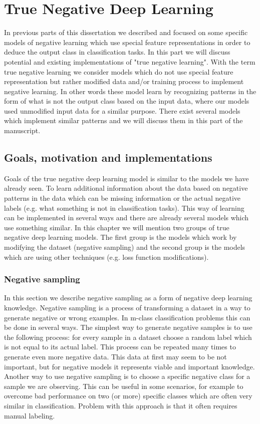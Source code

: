 \documentclass[b5paper]{book}
\begin{document}
\part{True Negative Deep Learning}

In previous parts of this dissertation we described and focused on some specific models of negative learning which use special feature representations in order to deduce the output class in classification tasks. In this part we will discuss potential and existing implementations of "true negative learning". With the term true negative learning we consider models which do not use special feature representation but rather modified data and/or training process to implement negative learning. In other words these model learn by recognizing patterns in the form of what is not the output class based on the input data, where our models used unmodified input data for a similar purpose. There exist several models which implement similar patterns and we will discuss them in this part of the manuscript.

\chapter{Goals, motivation and implementations}

Goals of the true negative deep learning model is similar to the models we have already seen. To learn additional information about the data based on negative patterns in the data which can be missing information or the actual negative labels (e.g. what something is not in classification tasks). This way of learning can be implemented in several ways and there are already several models which use something similar. In this chapter we will mention two groups of true negative deep learning models. The first group is the models which work by modifying the dataset (negative sampling) and the second group is the models which are using other techniques (e.g. loss function modifications).

\section{Negative sampling}

In this section we describe negative sampling as a form of negative deep learning knowledge. Negative sampling is a process of transforming a dataset in a way to generate negative or wrong examples. In m-class classification problems this can be done in several ways. The simplest way to generate negative samples is to use the following process: for every sample in a dataset choose a random label which is not equal to its actual label. This process can be repeated many times to generate even more negative data. This data at first may seem to be not important, but for negative models it represents viable and important knowledge. Another way to use negative sampling is to choose a specific negative class for a sample we are observing. This can be useful in some scenarios, for example to overcome bad performance on two (or more) specific classes which are often very similar in classification. Problem with this approach is that it often requires manual labeling.
\end{document}
